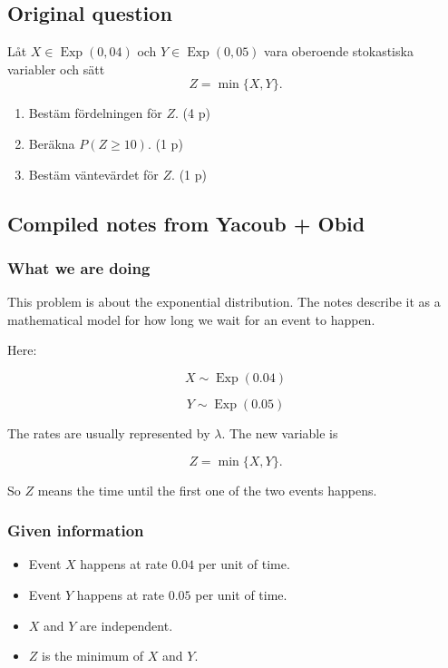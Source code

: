 \documentclass[10pt]{article}
\begin{document}
\subsection*{Original question}
Låt $X \in \operatorname{Exp}(0,04)$ och
$Y \in \operatorname{Exp}(0,05)$ vara oberoende stokastiska variabler
och sätt
\[
Z=\min\{X,Y\}.
\]

\begin{enumerate}[label=\alph*)]
\item Bestäm fördelningen för $Z$.
\hfill (4 p)
\item Beräkna $P(Z\geq 10)$.
\hfill (1 p)
\item Bestäm väntevärdet för $Z$.
\hfill (1 p)
\end{enumerate}

\subsection*{Compiled notes from Yacoub + Obid}

\subsubsection*{What we are doing}
This problem is about the exponential distribution.
The notes describe it as a mathematical model for
how long we wait for an event to happen.

Here:

\[
X\sim \operatorname{Exp}(0.04)
\]

\[
Y\sim \operatorname{Exp}(0.05)
\]

The rates are usually represented by $\lambda$.
The new variable is

\[
Z=\min\{X,Y\}.
\]

So $Z$ means the time until the first one of the two
events happens.

\subsubsection*{Given information}
\begin{itemize}
\item Event $X$ happens at rate $0.04$ per unit of time.
\item Event $Y$ happens at rate $0.05$ per unit of time.
\item $X$ and $Y$ are independent.
\item $Z$ is the minimum of $X$ and $Y$.
\end{itemize}
\end{document}
